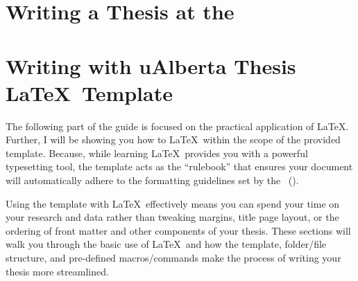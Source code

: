 \documentclass[
	oneside,
	chapterbib,
	saychapapp,
	simpleheaders,
	colourlinks]{ualberta}
\begin{document}
	\doublespacing         %

%
% 


\part{Writing a Thesis at the \University}\label{prt:writing}

\part{Writing with uAlberta Thesis \LaTeX\ Template}\label{prt:writingwithlatex}
	The following part of the guide is focused on the practical application of \LaTeX.
	Further, I will be showing you how to \LaTeX\ within the scope of the provided template. 
	Because, while learning \LaTeX\ provides you with a powerful typesetting tool, the template acts as the \enquote{rulebook} that ensures your document will automatically adhere to the  formatting guidelines set by the \Faculty\ (\Fac). 

	Using the template with \LaTeX\ effectively means you can spend your time on your research and data rather than tweaking margins, title page layout, or the ordering of front matter and other components of your thesis. 
	These sections will walk you through the basic use of \LaTeX\ and how the template, folder/file structure, and pre-defined macros/commands make the process of writing your thesis more streamlined.
\end{document}
